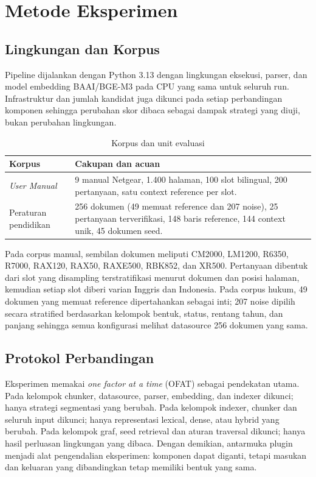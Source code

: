 \section{Metode Eksperimen}

\subsection{Lingkungan dan Korpus}

Pipeline dijalankan dengan Python 3.13 dengan lingkungan eksekusi, parser, dan model embedding BAAI/BGE-M3 pada CPU yang sama untuk seluruh run. Infrastruktur dan jumlah kandidat juga dikunci pada setiap perbandingan komponen sehingga perubahan skor dibaca sebagai dampak strategi yang diuji, bukan perubahan lingkungan.

\begin{table}[t]
\centering
\caption{Korpus dan unit evaluasi}
\label{tab:korpus}
\scriptsize
\begin{tabularx}{\columnwidth}{@{}p{}X@{}}
\toprule
\textbf{Korpus} & \textbf{Cakupan dan acuan}\\
\midrule
\textit{User Manual} & 9 manual Netgear, 1.400 halaman, 100 slot bilingual, 200 pertanyaan, satu context reference per slot.\\
Peraturan pendidikan & 256 dokumen (49 memuat reference dan 207 noise), 25 pertanyaan terverifikasi, 148 baris reference, 144 context unik, 45 dokumen seed.\\
\bottomrule
\end{tabularx}
\end{table}

Pada corpus manual, sembilan dokumen meliputi CM2000, LM1200, R6350, R7000, RAX120, RAX50, RAXE500, RBK852, dan XR500. Pertanyaan dibentuk dari slot yang disampling terstratifikasi menurut dokumen dan posisi halaman, kemudian setiap slot diberi varian Inggris dan Indonesia. Pada corpus hukum, 49 dokumen yang memuat reference dipertahankan sebagai inti; 207 noise dipilih secara stratified berdasarkan kelompok bentuk, status, rentang tahun, dan panjang sehingga semua konfigurasi melihat datasource 256 dokumen yang sama.

\subsection{Protokol Perbandingan}

Eksperimen memakai \textit{one factor at a time} (OFAT) sebagai pendekatan utama. Pada kelompok chunker, datasource, parser, embedding, dan indexer dikunci; hanya strategi segmentasi yang berubah. Pada kelompok indexer, chunker dan seluruh input dikunci; hanya representasi lexical, dense, atau hybrid yang berubah. Pada kelompok graf, seed retrieval dan aturan traversal dikunci; hanya hasil perluasan lingkungan yang dibaca. Dengan demikian, antarmuka plugin menjadi alat pengendalian eksperimen: komponen dapat diganti, tetapi masukan dan keluaran yang dibandingkan tetap memiliki bentuk yang sama.

